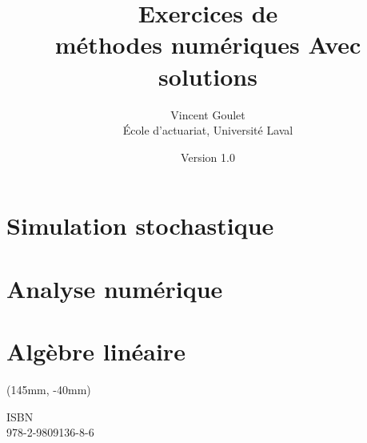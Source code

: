 \documentclass[letterpaper,10pt]{memoir}
\title{\HUGE Exercices de \\ méthodes numériques
    \huge Avec solutions}
\author{\LARGE Vincent Goulet \\[3mm]
    \large École d'actuariat, Université Laval}
\date{\large Version 1.0}
\newcommand{\ISBN}{978-2-9809136-8-6}
\begin{document}

\frontmatter

\pagestyle{empty}


\pagestyle{companion}



\cleardoublepage
\tableofcontents*

\mainmatter


\part{Simulation stochastique}
\label{part:simulation}




\part{Analyse numérique}
\label{part:analysenumerique}




\part{Algèbre linéaire}
\label{part:algebrelineaire}





\appendix


\nocite{Gentle_98,Monahan_01,Rubinstein_81,Ripley_87,BurdenFaires,Anton8e}




\cleardoublepage
\printindex

\cleardoublepage
\cleartoverso

\pagestyle{empty}
\renewcommand{\ttdefault}{hlst}

\bandeverso
\begin{textblock*}{71mm}(145mm, -40mm)
  \large\ttfamily\raggedright
  \textblockcolor{}
  ISBN \\ \ISBN
\end{textblock*}
\end{document}
